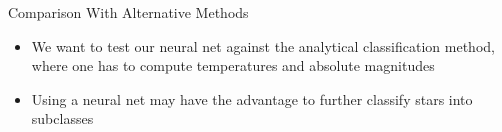 \documentclass[aspectratio=1610, 9pt]{beamer}
\begin{document}
  \begin{frame}{Comparison With Alternative Methods}
    \begin{itemize}
      \setlength{\itemsep}{2em}
      \item We want to test our neural net against the analytical classification method, where one has to compute temperatures and absolute magnitudes
      \item Using a neural net may have the advantage to further classify stars into subclasses
    \end{itemize}
  \end{frame}
\end{document}
